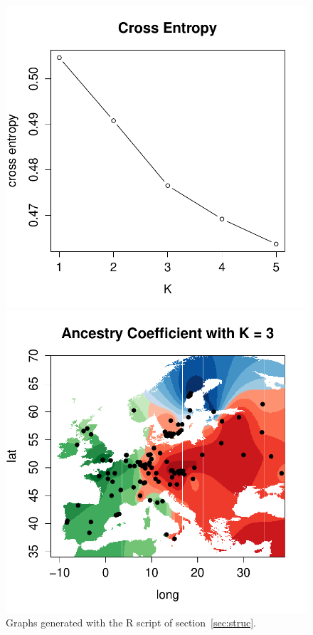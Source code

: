 \documentclass[10pt,a4paper]{article}
\begin{document}


\begin{figure}[h!]\centering
\begin{minipage}{0.49\textwidth}
\includegraphics[width=\linewidth]{crossEntropy.pdf}
\end{minipage}
\begin {minipage}{0.49\textwidth}
\includegraphics[width=\linewidth]{map.pdf}
\end{minipage}
\caption{Graphs generated with the R script of section~\ref{sec:struc}.}\label{fig:map}
\end{figure} 
\end{document}
